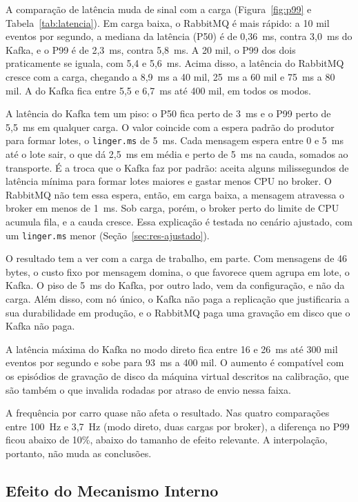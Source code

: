 \documentclass[12pt]{article}
\begin{document}
A comparação de latência muda de sinal com a carga (Figura~\ref{fig:p99} e
Tabela~\ref{tab:latencia}). Em carga baixa, o RabbitMQ é mais rápido: a 10 mil
eventos por segundo, a mediana da latência (P50) é de 0,36~ms, contra 3,0~ms do
Kafka, e o P99 é de 2,3~ms, contra 5,8~ms. A 20 mil, o P99 dos dois praticamente
se iguala, com 5,4 e 5,6~ms. Acima disso, a latência do RabbitMQ cresce com a
carga, chegando a 8,9~ms a 40 mil, 25~ms a 60 mil e 75~ms a 80 mil. A do Kafka
fica entre 5,5 e 6,7~ms até 400 mil, em todos os modos.

A latência do Kafka tem um piso: o P50 fica perto de 3~ms e o P99 perto de
5,5~ms em qualquer carga. O valor coincide com a espera padrão do produtor para
formar lotes, o \texttt{linger.ms} de 5~ms. Cada mensagem espera entre 0 e 5~ms
até o lote sair, o que dá 2,5~ms em média e perto de 5~ms na cauda, somados ao
transporte. É a troca que o Kafka faz por padrão: aceita alguns milissegundos de
latência mínima para formar lotes maiores e gastar menos CPU no broker. O
RabbitMQ não tem essa espera, então, em carga baixa, a mensagem atravessa o
broker em menos de 1~ms. Sob carga, porém, o broker perto do limite de CPU
acumula fila, e a cauda cresce. Essa explicação é testada no cenário ajustado,
com um \texttt{linger.ms} menor (Seção~\ref{sec:res-ajustado}).

O resultado tem a ver com a carga de trabalho, em parte. Com mensagens de 46
bytes, o custo fixo por mensagem domina, o que favorece quem agrupa em lote, o
Kafka. O piso de 5~ms do Kafka, por outro lado, vem da configuração, e não da
carga. Além disso, com nó único, o Kafka não paga a replicação que justificaria a
sua durabilidade em produção, e o RabbitMQ paga uma gravação em disco que o
Kafka não paga.

A latência máxima do Kafka no modo direto fica entre 16 e 26~ms até 300 mil eventos
por segundo e sobe para 93~ms a 400 mil. O aumento é compatível com os episódios de gravação de
disco da máquina virtual descritos na calibração, que são também o que invalida
rodadas por atraso de envio nessa faixa.

A frequência por carro quase não afeta o resultado. Nas quatro comparações entre
100~Hz e 3,7~Hz (modo direto, duas cargas por broker), a diferença no P99 ficou
abaixo de 10\%, abaixo do tamanho de efeito relevante. A interpolação, portanto,
não muda as conclusões.

\subsection{Efeito do Mecanismo Interno}
\end{document}
